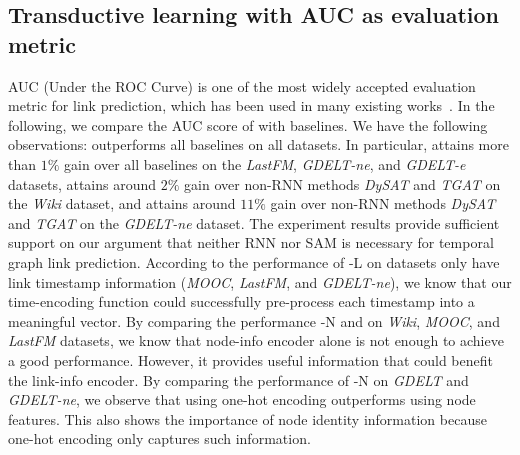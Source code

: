 \subsection{Transductive learning with AUC as evaluation metric} \label{section:transductive_AUC_score}
AUC (Under the ROC Curve) is one of the most widely accepted evaluation metric for link prediction, which has been used in many existing works~\cite{xu2020inductive,tgn_icml_grl2020}.
In the following, we compare the AUC score of \our with baselines.
We have the following observations: 
 \our outperforms all baselines on all datasets. In particular, \our attains more than $1\%$ gain over all baselines on the \textit{LastFM}, \textit{GDELT-ne}, and \textit{GDELT-e} datasets, attains around $2\%$ gain over non-RNN methods \textit{DySAT} and \textit{TGAT} on the \textit{Wiki} dataset, and attains around $11\%$ gain over non-RNN methods \textit{DySAT} and \textit{TGAT} on the \textit{GDELT-ne} dataset. The experiment results provide sufficient support on our argument that neither RNN nor SAM is necessary for temporal graph link prediction.
 According to the performance of \oure-L on datasets only have link timestamp information (\textit{MOOC}, \textit{LastFM}, and \textit{GDELT-ne}), we know that our time-encoding function could successfully pre-process each timestamp into a meaningful vector. 
 By comparing the performance \oure-N and \our on \textit{Wiki}, \textit{MOOC}, and \textit{LastFM} datasets, we know that node-info encoder alone is not enough to achieve a good performance. However, it provides useful information that could benefit the link-info encoder.
 By comparing the performance of \oure-N on \textit{GDELT} and \textit{GDELT-ne}, we observe that using one-hot encoding outperforms using node features. This also shows the importance of node identity information because one-hot encoding only captures such information. 

